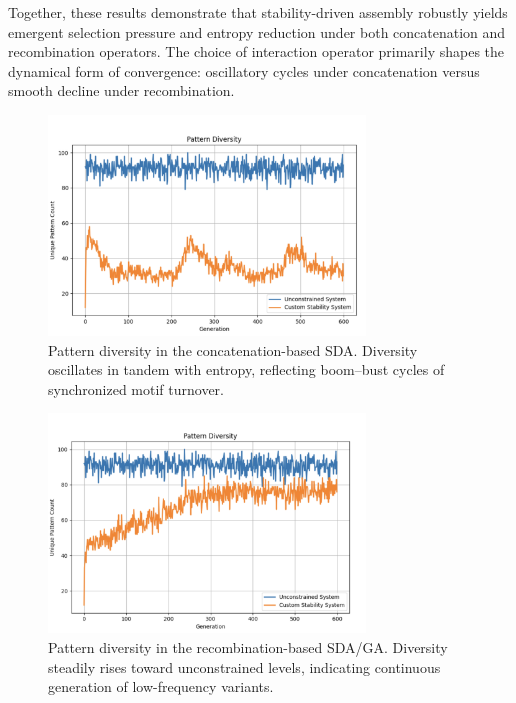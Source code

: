 \documentclass[life,article,submit,pdftex,moreauthors]{Definitions/mdpi}
\begin{document}
Together, these results demonstrate that stability-driven assembly robustly yields emergent selection pressure and entropy reduction under both concatenation and recombination operators. The choice of interaction operator primarily shapes the dynamical form of convergence: oscillatory cycles under concatenation versus smooth decline under recombination.

\begin{figure}[H]
    \centering
    \includegraphics[width=0.75\textwidth]{SDA-concat-diversity.png}
    \caption{Pattern diversity in the concatenation-based SDA. Diversity oscillates in tandem with entropy, reflecting boom--bust cycles of synchronized motif turnover.}
    \label{fig:concat-diversity}
\end{figure}

\begin{figure}[H]
    \centering
    \includegraphics[width=0.75\textwidth]{SDA-GA-diversity.png}
    \caption{Pattern diversity in the recombination-based SDA/GA. Diversity steadily rises toward unconstrained levels, indicating continuous generation of low-frequency variants.}
    \label{fig:ga-diversity}
\end{figure}
\end{document}
